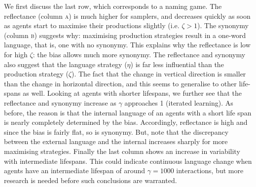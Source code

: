 \documentclass{../src/bcthesispart}
\begin{document}
We first discuss the last row, which corresponds to a naming game.
The reflectance (column \textsc{a}) is much higher for samplers, and decreases quickly as soon as agents start to maximise their productions slightly (i.e. $\zeta > 1$). 
The synonymy (column \textsc{b}) suggests why: maximising production strategies result in a one-word language, that is, one with no synonymy.
This explains why the reflectance is low for high $\zeta$: the bias allows much more synonymy.
The reflectance and synonymy also suggest that the language strategy ($\eta$) is far less influential than the production strategy ($\zeta$).
The fact that the change in vertical direction is smaller than the change in horizontal direction, and this seems to generalise to other life-spans as well.
Looking at agents with shorter lifespans, we further see that the reflectance and synonymy increase as $\gamma$ approaches 1 (iterated learning).
As before, the reason is that the internal language of an agents with a short life span is nearly completely determined by the bias.
Accordingly, reflectance is high and since the bias is fairly flat, so is synonymy.
But, note that the discrepancy between the external language and the internal  increases sharply for more maximising strategies.
Finally the last column shows an increase in variability with intermediate lifespans. 
This could indicate continuous language change when agents have an intermediate lifespan of around $\gamma=1000$ interactions, but more research is needed before such conclusions are warranted.

\end{document}
